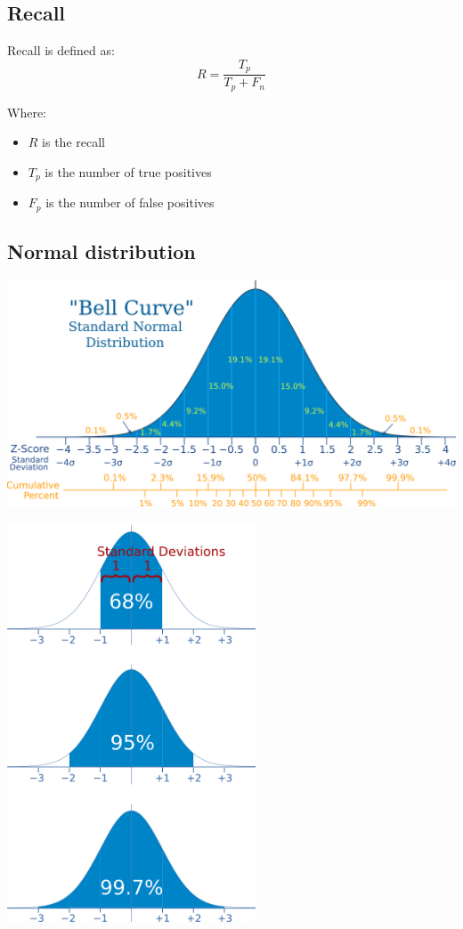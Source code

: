 \documentclass[11pt]{article}
\begin{document}
 \newpage
\subsection{Recall}
\label{sec:org1a012f3}
Recall is defined as:
\[R = \frac{T_p}{T_p + F_n}\]

Where:
\begin{itemize}
\item \(R\) is the recall
\item \(T_p\) is the number of true positives
\item \(F_p\) is the number of false positives
\end{itemize}

 \newpage
\subsection{Normal distribution}
\label{sec:org8db950a}
\begin{center}
\includegraphics[width=.9\linewidth]{./images/normal-distribution-curve-granular-percentages.png}
\end{center}

\begin{center}
\includegraphics[height=32em]{./images/normal-distribution-curves-broad-percentages.png}
\end{center}
\end{document}
